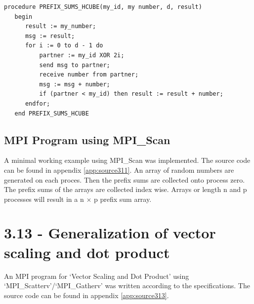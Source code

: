 \documentclass[a4paper,11pt,twoside]{article}
\begin{document}
\begin{verbatim}
procedure PREFIX_SUMS_HCUBE(my_id, my number, d, result) 
   begin 
      result := my_number; 
      msg := result; 
      for i := 0 to d - 1 do 
          partner := my_id XOR 2i; 
          send msg to partner; 
          receive number from partner; 
          msg := msg + number; 
          if (partner < my_id) then result := result + number; 
      endfor; 
   end PREFIX_SUMS_HCUBE
\end{verbatim}



\subsection*{MPI Program using MPI\_Scan}
A minimal working example using MPI\_Scan was implemented. The source code can be found in appendix \ref{app:source311}. An array of random numbers are generated on each proces. Then the prefix sums are collected onto process zero. The prefix sums of the arrays are collected index wise. Arrays or length n and p processes will result in a n $\times$ p prefix sum array.  


\section{3.13 - Generalization of vector scaling and dot product}
An MPI program for `Vector Scaling and Dot Product' using `MPI\_Scatterv'/`MPI\_Gatherv' was written according to the specifications. The source code can be found in appendix \ref{app:source313}.
\end{document}
